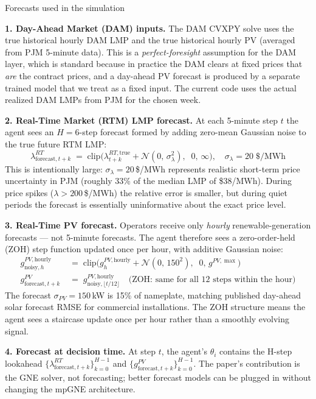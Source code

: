 \documentclass[11pt, letterpaper]{article}
\begin{document}
\begin{answerbox}{Forecasts used in the simulation}

\textbf{1. Day-Ahead Market (DAM) inputs.}
The DAM CVXPY solve uses the true historical hourly DAM LMP and the true historical hourly PV (averaged from PJM 5-minute data). This is a \emph{perfect-foresight} assumption for the DAM layer, which is standard because in practice the DAM clears at fixed prices that \emph{are} the contract prices, and a day-ahead PV forecast is produced by a separate trained model that we treat as a fixed input. The current code uses the actual realized DAM LMPs from PJM for the chosen week.

\textbf{2. Real-Time Market (RTM) LMP forecast.}
At each 5-minute step $t$ the agent sees an $H = 6$-step forecast formed by adding zero-mean Gaussian noise to the true future RTM LMP:
\[
\lambda^{RT}_{\text{forecast}, t+k} \;=\; \mathrm{clip}\!\Big(\lambda^{RT,\text{true}}_{t+k} + \mathcal{N}(0,\, \sigma_\lambda^2),\;\; 0,\, \infty\Big), \quad \sigma_\lambda = 20\;\$/\text{MWh}
\]
This is intentionally large: $\sigma_\lambda = 20$\,\$/MWh represents realistic short-term price uncertainty in PJM (roughly 33\% of the median LMP of \$38/MWh). During price spikes ($\lambda > 200$\,\$/MWh) the relative error is smaller, but during quiet periods the forecast is essentially uninformative about the exact price level.

\textbf{3. Real-Time PV forecast.}
Operators receive only \emph{hourly} renewable-generation forecasts — not 5-minute forecasts. The agent therefore sees a zero-order-held (ZOH) step function updated once per hour, with additive Gaussian noise:
\begin{align*}
g^{PV,\text{hourly}}_{\text{noisy},h} &\;=\; \mathrm{clip}\!\Big(g^{PV,\text{hourly}}_h + \mathcal{N}(0,\, 150^2),\;\; 0,\, g^{PV,\max}\Big) \\
g^{PV}_{\text{forecast}, t+k} &\;=\; g^{PV,\text{hourly}}_{\text{noisy},\lfloor t/12\rfloor} \quad \text{(ZOH: same for all 12 steps within the hour)}
\end{align*}
The forecast $\sigma_{PV} = 150$\,kW is 15\% of nameplate, matching published day-ahead solar forecast RMSE for commercial installations. The ZOH structure means the agent sees a staircase update once per hour rather than a smoothly evolving signal.

\textbf{4. Forecast at decision time.}
At step $t$, the agent's $\theta_i$ contains the H-step lookahead $\{\lambda^{RT}_{\text{forecast},t+k}\}_{k=0}^{H-1}$ and $\{g^{PV}_{\text{forecast},t+k}\}_{k=0}^{H-1}$. The paper's contribution is the GNE solver, not forecasting; better forecast models can be plugged in without changing the mpGNE architecture.


\end{answerbox}
\end{document}
